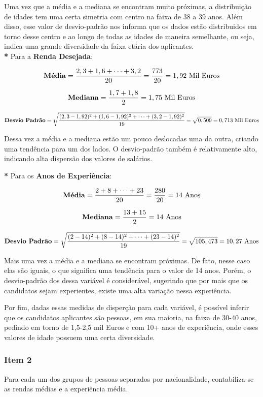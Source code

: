 \documentclass[a4paper,11pt]{article}
\begin{document}
Uma vez que a média e a mediana se encontram muito próximas, a distribuição de idades tem uma certa simetria com centro na faixa de 38 a 39 anos. Além disso, esse valor de desvio-padrão nos informa que os dados estão distribuidos em torno desse centro e ao longo de todas as idades de maneira semelhante, ou seja, indica uma grande diversidade da faixa etária dos aplicantes. \\


\textbf{*} Para a \textbf{Renda Desejada}:

\[
\text{\textbf{Média}} =  \frac{2,3 + 1,6 + \cdots + 3,2}{20} =  \frac{773}{20} = 1,92 \text{ Mil Euros}
\]
    

\[
\text{\textbf{Mediana}} = \frac{1,7 + 1,8}{2} = 1,75 \text{ Mil Euros}
\]


\[
\text{\textbf{Desvio Padrão}} = \sqrt{\frac{(2,3-1,92)^2 + (1,6-1,92)^2 + \cdots + (3,2-1,92)^2}{19}} = \sqrt{0,509} = 0,713 \text{ Mil Euros}
\]

Dessa vez a média e a mediana estão um pouco deslocadas uma da outra, criando uma tendência para um dos lados. O desvio-padrão também é relativamente alto, indicando alta dispersão dos valores de salários.

\textbf{*} Para os \textbf{Anos de Experiência}:

\[
\text{\textbf{Média}} =  \frac{2 + 8 + \cdots + 23}{20} =  \frac{280}{20} = 14 \text{ Anos}
\]
    

\[
\text{\textbf{Mediana}} = \frac{13 + 15}{2} = 14 \text{ Anos}
\]


\[
\text{\textbf{Desvio Padrão}} = \sqrt{\frac{(2-14)^2 + (8-14)^2 + \cdots + (23-14)^2}{19}} = \sqrt{105,473} = 10,27 \text{ Anos}
\]

Mais uma vez a média e a mediana se encontram próximas. De fato, nesse caso elas são iguais, o que significa uma tendência para o valor de 14 anos. Porém, o desvio-padrão dos dessa variável é considerável, sugerindo que por mais que os candidatos sejam experientes, existe uma alta variação nessa experiência.

Por fim, dadas essas medidas de disperção para cada variável, é possível inferir que os candidatos aplicantes são pessoas, em sua maioria, na faixa de 30-40 anos, pedindo em torno de 1,5-2,5 mil Euros e com 10+ anos de experiência, onde esses valores de idade possuem uma certa diversidade.

\subsubsection{Item 2}
Para cada um dos grupos de pessoas separados por nacionalidade, contabiliza-se as rendas médias e a experiência média.
\end{document}
